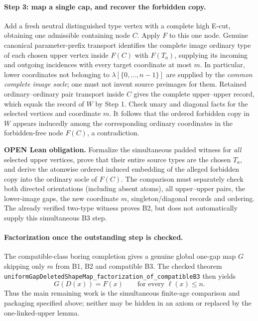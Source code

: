 \paragraph{Step 3: map a single cap, and recover the forbidden copy.}
Add a fresh neutral distinguished type vertex with a complete
high E-cut, obtaining one admissible containing node $C$.
Apply $F$ to this one node. Genuine canonical parameter-prefix
transport identifies the complete image ordinary type of each
chosen upper vertex inside $F(C)$ with $F(T_a)$, supplying
its incoming and outgoing incidences with every target
coordinate at most $m$. In particular, lower coordinates not
belonging to $\lambda[\{0,\ldots,n-1\}]$ are supplied by the
\emph{common complete image socle}; one must not invent
source preimages for them. Retained ordinary--ordinary pair
transport inside $C$ gives the complete upper--upper record,
which equals the record of $W$ by Step 1. Check unary and
diagonal facts for the selected vertices and coordinate $m$.
It follows that the ordered forbidden copy in $W$ appears
inducedly among the corresponding ordinary coordinates in
the forbidden-free node $F(C)$, a contradiction.

\noindent\textbf{OPEN Lean obligation.} Formalize the simultaneous
padded witness for \emph{all} selected upper vertices, prove that
their entire source types are the chosen $T_a$, and derive the
atomwise ordered induced embedding of the alleged forbidden
copy into the ordinary socle of $F(C)$. The comparison must
separately check both directed orientations (including absent
atoms), all upper--upper pairs, the lower-image gaps, the
new coordinate $m$, singleton/diagonal records and ordering.
The already verified two-type witness proves B2, but does
not automatically supply this simultaneous B3 step.

\paragraph{Factorization once the outstanding step is checked.}
The compatible-class boring completion gives a genuine global
one-gap map $G$ skipping only $m$ from B1, B2 and compatible B3.
The checked theorem
\texttt{uniformGapDeletedShapeMap\_factorization\_of\_compatibleB3}
then yields
\[
 G(D(x))=F(x)\qquad\text{for every } \ell(x)\le n.
\]
Thus the main remaining work is the simultaneous finite-age
comparison and packaging specified above; neither may be
hidden in an axiom or replaced by the one-linked-upper lemma.

